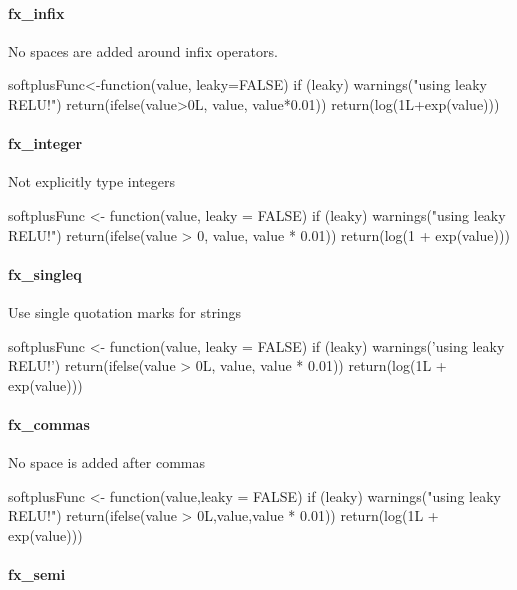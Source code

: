 \paragraph{fx\_infix}

No spaces are added around infix operators.

\begin{example}
softplusFunc<-function(value, leaky=FALSE) {
    if (leaky) {
        warnings("using leaky RELU!")
        return(ifelse(value>0L, value, value*0.01))
    }
    return(log(1L+exp(value)))
}
\end{example}

\paragraph{fx\_integer}

Not explicitly type integers

\begin{example}
softplusFunc <- function(value, leaky = FALSE) {
    if (leaky) {
        warnings("using leaky RELU!")
        return(ifelse(value > 0, value, value * 0.01))
    }
    return(log(1 + exp(value)))
}
\end{example}

\paragraph{fx\_singleq}

Use single quotation marks for strings

\begin{example}
softplusFunc <- function(value, leaky = FALSE) {
    if (leaky) {
        warnings('using leaky RELU!')
        return(ifelse(value > 0L, value, value * 0.01))
    }
    return(log(1L + exp(value)))
}
\end{example}

\paragraph{fx\_commas}

No space is added after commas

\begin{example}
softplusFunc <- function(value,leaky = FALSE) {
    if (leaky) {
        warnings("using leaky RELU!")
        return(ifelse(value > 0L,value,value * 0.01))
    }
    return(log(1L + exp(value)))
}
\end{example}

\paragraph{fx\_semi}

